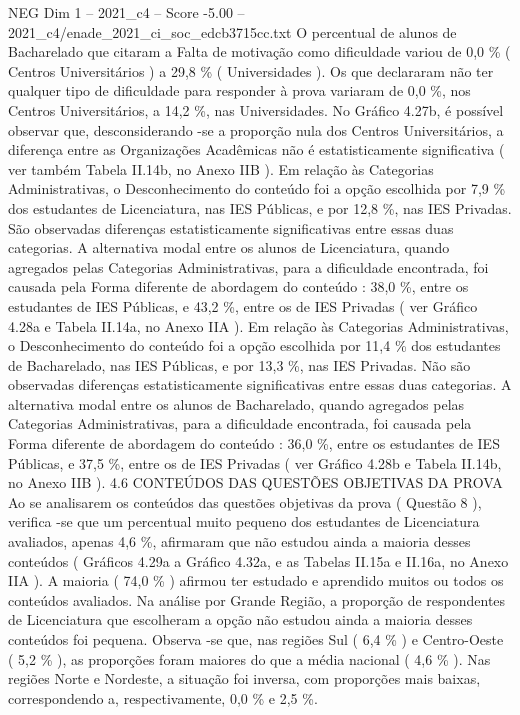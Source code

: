 \begin{textsample}{NEG Dim 1 – 2021\_c4 – Score -5.00 – 2021\_c4/enade\_2021\_ci\_soc\_edcb3715cc.txt}
O percentual de alunos de Bacharelado que citaram a Falta de motivação como dificuldade variou de 0,0 \% ( Centros Universitários ) a 29,8 \% ( Universidades ).
Os que declararam não ter qualquer tipo de dificuldade para responder à prova variaram de 0,0 \%, nos Centros Universitários, a 14,2 \%, nas Universidades.
No Gráfico 4.27b, é possível observar que, desconsiderando -se a proporção nula dos Centros Universitários, a diferença entre as Organizações Acadêmicas não é estatisticamente significativa ( ver também Tabela II.14b, no Anexo IIB ).
Em relação às Categorias Administrativas, o Desconhecimento do conteúdo foi a opção escolhida por 7,9 \% dos estudantes de Licenciatura, nas IES Públicas, e por 12,8 \%, nas IES Privadas.
São observadas diferenças estatisticamente significativas entre essas duas categorias.
A alternativa modal entre os alunos de Licenciatura, quando agregados pelas Categorias Administrativas, para a dificuldade encontrada, foi causada pela Forma diferente de abordagem do conteúdo : 38,0 \%, entre os estudantes de IES Públicas, e 43,2 \%, entre os de IES Privadas ( ver Gráfico 4.28a e Tabela II.14a, no Anexo IIA ).
Em relação às Categorias Administrativas, o Desconhecimento do conteúdo foi a opção escolhida por 11,4 \% dos estudantes de Bacharelado, nas IES Públicas, e por 13,3 \%, nas IES Privadas.
Não são observadas diferenças estatisticamente significativas entre essas duas categorias.
A alternativa modal entre os alunos de Bacharelado, quando agregados pelas Categorias Administrativas, para a dificuldade encontrada, foi causada pela Forma diferente de abordagem do conteúdo : 36,0 \%, entre os estudantes de IES Públicas, e 37,5 \%, entre os de IES Privadas ( ver Gráfico 4.28b e Tabela II.14b, no Anexo IIB ). 4.6 CONTEÚDOS DAS QUESTÕES OBJETIVAS DA PROVA Ao se analisarem os conteúdos das questões objetivas da prova ( Questão 8 ), verifica -se que um percentual muito pequeno dos estudantes de Licenciatura avaliados, apenas 4,6 \%, afirmaram que não estudou ainda a maioria desses conteúdos ( Gráficos 4.29a a Gráfico 4.32a, e as Tabelas II.15a e II.16a, no Anexo IIA ).
A maioria ( 74,0 \% ) afirmou ter estudado e aprendido muitos ou todos os conteúdos avaliados.
Na análise por Grande Região, a proporção de respondentes de Licenciatura que escolheram a opção não estudou ainda a maioria desses conteúdos foi pequena.
Observa -se que, nas regiões Sul ( 6,4 \% ) e Centro-Oeste ( 5,2 \% ), as proporções foram maiores do que a média nacional ( 4,6 \% ).
Nas regiões Norte e Nordeste, a situação foi inversa, com proporções mais baixas, correspondendo a, respectivamente, 0,0 \% e 2,5 \%.

\end{textsample}
